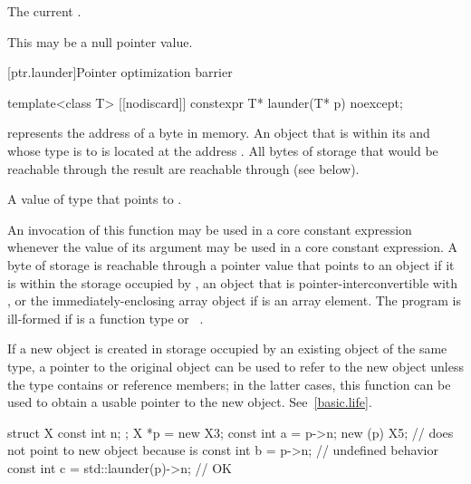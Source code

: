 \begin{itemdescr}
\pnum
\returns The current .
\begin{note} This may be a null pointer value. \end{note}
\end{itemdescr}

[ptr.launder]{Pointer optimization barrier}

%
\begin{itemdecl}
template<class T> [[nodiscard]] constexpr T* launder(T* p) noexcept;
\end{itemdecl}

\begin{itemdescr}
\pnum
\requires
{} represents the address  of a byte in memory.
An object  that is within its 
and whose type is  to 
is located at the address .
All bytes of storage that would be reachable through the result
are reachable through  (see below).

\pnum
\returns
A value of type  that points to .

\pnum
\remarks
An invocation of this function
may be used in a core constant expression
whenever the value of its argument
may be used in a core constant expression.
A byte of storage is
reachable through a pointer value
that points to an object 
if it is within the storage occupied by
,
an object that is pointer-interconvertible with , or
the immediately-enclosing array object if  is an array element.
The program is ill-formed if  is a function type
or \cv{}~.

\pnum
\begin{note}
If a new object is created
in storage occupied by an existing object of the same type,
a pointer to the original object
can be used to refer to the new object
unless the type contains  or reference members;
in the latter cases,
this function can be used to obtain a usable pointer to the new object.
See~\ref{basic.life}.
\end{note}

\pnum
\begin{example}
\begin{codeblock}
struct X { const int n; };
X *p = new X{3};
const int a = p->n;
new (p) X{5};                       //  does not point to new object because  is 
const int b = p->n;                 // undefined behavior
const int c = std::launder(p)->n;   // OK
\end{codeblock}
\end{example}
\end{itemdescr}

